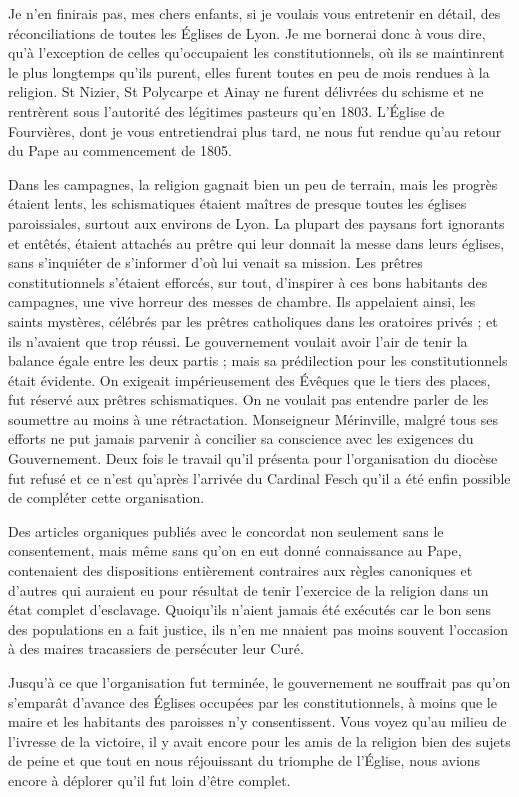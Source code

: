 \documentclass[11pt,a4paper]{report}
\begin{document}
Je n'en finirais pas, mes chers enfants, si je voulais vous entretenir en détail, des réconciliations de toutes les Églises de Lyon. Je me bornerai donc à vous dire, qu'à l'exception de celles qu'occupaient les constitutionnels, où ils se maintinrent le plus longtemps qu'ils purent, elles furent toutes en peu de mois rendues à la religion. St Nizier, St Polycarpe et Ainay ne furent délivrées du schisme et ne rentrèrent sous l'autorité des légitimes pasteurs qu'en 1803. L'Église de Fourvières, dont je vous entretiendrai plus tard, ne nous fut rendue qu'au retour du Pape au commencement de 1805.

Dans les campagnes, la religion gagnait bien un peu de terrain, mais les progrès étaient lents, les schismatiques étaient maîtres de presque toutes les églises paroissiales, surtout aux environs de Lyon. La plupart des paysans fort ignorants et entêtés, étaient attachés au prêtre qui leur donnait la messe dans leurs églises, sans s'inquiéter de s'informer d'où lui venait sa mission. Les prêtres constitutionnels s'étaient efforcés, sur tout, d'inspirer à ces bons habitants des campagnes, une vive horreur des messes de chambre. Ils appelaient ainsi, les saints mystères, célébrés par les prêtres catholiques dans les oratoires privés ; et ils n'avaient que trop réussi. Le gouvernement voulait avoir l'air de tenir la balance égale entre les deux partis ; mais sa prédilection pour les constitutionnels était évidente. On exigeait impérieusement des Évêques que le tiers des places, fut réservé aux prêtres schismatiques. On ne voulait pas entendre parler de les soumettre au moins à une rétractation. Monseigneur Mérinville, malgré tous ses efforts ne put jamais parvenir à concilier sa conscience avec les exigences du Gouvernement. Deux fois le travail qu'il présenta pour l'organisation du diocèse fut refusé et ce n'est qu'après l'arrivée du Cardinal Fesch qu'il a été enfin possible de compléter cette organisation.

Des articles organiques publiés avec le concordat non seulement sans le consentement, mais même sans qu'on en eut donné connaissance au Pape, contenaient des dispositions entièrement contraires aux règles canoniques et d'autres qui auraient eu pour résultat de tenir l'exercice de la religion dans un état complet d'esclavage. Quoiqu'ils n'aient jamais été exécutés car le bon sens des populations en a fait justice, ils n'en me nnaient pas moins souvent l'occasion à des maires tracassiers de persécuter leur Curé.

Jusqu'à ce que l'organisation fut terminée, le gouvernement ne souffrait pas qu'on s'emparât d'avance des Églises occupées par les constitutionnels, à moins que le maire et les habitants des paroisses n'y consentissent. Vous voyez qu'au milieu de l'ivresse de la victoire, il y avait encore pour les amis de la religion bien des sujets de peine et que tout en nous réjouissant du triomphe de l'Église, nous avions encore à déplorer qu'il fut loin d'être complet.
\end{document}
